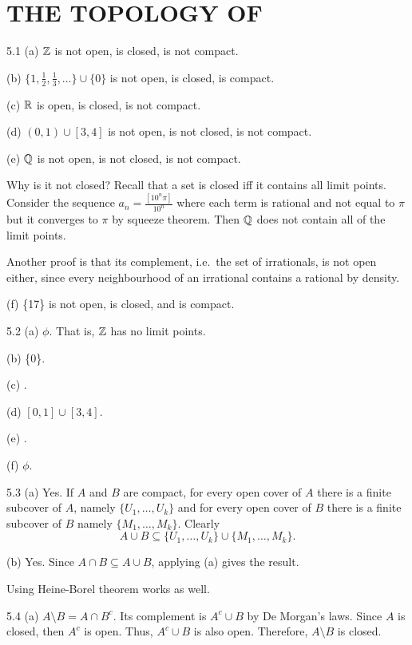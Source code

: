 \section{THE TOPOLOGY OF \R}
5.1 (a) $\mathbb{Z}$ is not open, is closed, is not compact.

(b) $\{1,\frac{1}{2},\frac{1}{3},\ldots\} \cup \{0\}$ is not open, is closed, is compact.

(c) $\mathbb{R}$ is open, is closed, is not compact.

(d) $(0,1) \cup [3,4]$ is not open, is not closed, is not compact.

(e) $\mathbb{Q}$ is not open, is not closed, is not compact. 
\begin{remark}
    Why is it not closed? Recall that a set is closed iff it contains all limit points. Consider the sequence $a_n=\frac{[10^n\pi]}{10^n}$ where each term is rational and not equal to $\pi$ but it converges to $\pi$ by squeeze theorem.
    Then $\mathbb{Q}$ does not contain all of the limit points.

    Another proof is that its complement, i.e.\ the set of irrationals, is not open either, since every neighbourhood of an irrational 
    contains a rational by density.
\end{remark}

(f) \{17\} is not open, is closed, and is compact.

5.2 (a) $\phi$. That is, $\mathbb{Z}$ has no limit points. 

(b) \{0\}.

(c) \R.

(d) $[0,1] \cup [3,4]$.

(e) \R.

(f) $\phi$.

5.3 (a) Yes. If $A$ and $B$ are compact, for every open cover of $A$ there is a finite subcover of $A$, namely $\{U_1,\ldots,U_k\}$ 
and for every open cover of $B$ there is a finite subcover of $B$ namely $\{M_1,\ldots,M_k\}$. Clearly \[A \cup B \subseteq \{U_1,\ldots,U_k\} \cup \{M_1,\ldots,M_k\}.\] 

(b) Yes. Since $A \cap B \subseteq A \cup B$, applying (a) gives the result.

\begin{remark}
    Using Heine-Borel theorem works as well.
\end{remark}

5.4 (a) $A \setminus B = A \cap B^c$. Its complement is $A^c \cup B$ by De Morgan's laws. Since $A$ is closed, then $A^c$ is open. Thus, $A^c \cup B$ is also open.
Therefore, $A \setminus B$ is closed.

